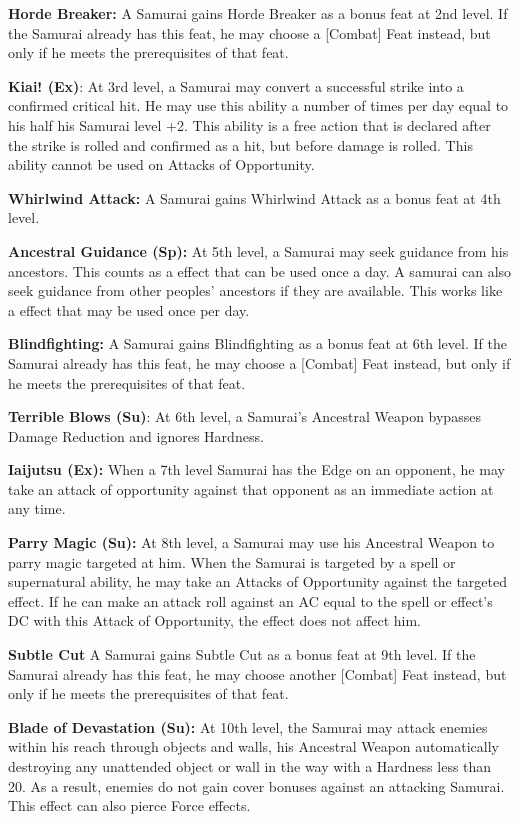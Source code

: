 \textbf{Horde Breaker:} A Samurai gains Horde Breaker as a bonus feat at 2nd level. If the Samurai already has this feat, he may choose a [Combat] Feat instead, but only if he meets the prerequisites of that feat.

\textbf{Kiai! (Ex)}: At 3rd level, a Samurai may convert a successful strike into a confirmed critical hit. He may use this ability a number of times per day equal to his half his Samurai level +2. This ability is a free action that is declared after the strike is rolled and confirmed as a hit, but before damage is rolled. This ability cannot be used on Attacks of Opportunity.

\textbf{Whirlwind Attack:} A Samurai gains Whirlwind Attack as a bonus feat at 4th level.

\textbf{Ancestral Guidance (Sp):} At 5th level, a Samurai may seek guidance from his ancestors. This counts as a  effect that can be used once a day. A samurai can also seek guidance from other peoples' ancestors if they are available. This works like a  effect that may be used once per day.

\textbf{Blindfighting:} A Samurai gains Blindfighting as a bonus feat at 6th level. If the Samurai already has this feat, he may choose a [Combat] Feat instead, but only if he meets the prerequisites of that feat.

\textbf{Terrible Blows (Su)}: At 6th level, a Samurai's Ancestral Weapon bypasses Damage Reduction and ignores Hardness.

\textbf{Iaijutsu (Ex):} When a 7th level Samurai has the Edge on an opponent, he may take an attack of opportunity against that opponent as an immediate action at any time. 

\textbf{Parry Magic (Su):} At 8th level, a Samurai may use his Ancestral Weapon to parry magic targeted at him. When the Samurai is targeted by a spell or supernatural ability, he may take an Attacks of Opportunity against the targeted effect. If he can make an attack roll against an AC equal to the spell or effect's DC with this Attack of Opportunity, the effect does not affect him.

\textbf{Subtle Cut} A Samurai gains Subtle Cut as a bonus feat at 9th level. If the Samurai already has this feat, he may choose another [Combat] Feat instead, but only if he meets the prerequisites of that feat.

\textbf{Blade of Devastation (Su):} At 10th level, the Samurai may attack enemies within his reach through objects and walls, his Ancestral Weapon automatically destroying any unattended object or wall in the way with a Hardness less than 20. As a result, enemies do not gain cover bonuses against an attacking Samurai. This effect can also pierce Force effects.

